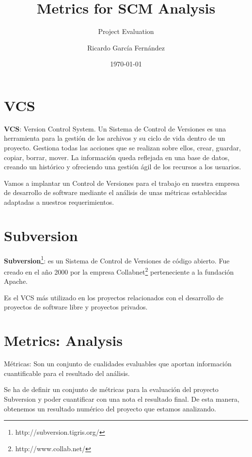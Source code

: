 \documentclass[11pt]{scrartcl}
\title{\textbf{Metrics for SCM Analysis}}
\subtitle{Project Evaluation}
\author{Ricardo Garc\'ia Fern\'andez}
\date{\today}
\begin{document}
\maketitle

\tableofcontents

\newpage

\section{VCS}

\par \textbf{VCS}: Version Control System. Un Sistema de Control de Versiones es una herramienta para la gesti\'on de los archivos y su ciclo de vida dentro de un proyecto. Gestiona todas las acciones que se realizan sobre ellos, crear, guardar, copiar, borrar, mover. La informaci\'on queda reflejada en una base de datos, creando un hist\'orico y ofreciendo una gesti\'on \'agil de los recursos a los usuarios.

\par Vamos a implantar un Control de Versiones para el trabajo en nuestra empresa de desarrollo de software mediante el an\'alisis de unas m\'etricas establecidas adaptadas a nuestros requerimientos.

\section{Subversion}

\textbf{Subversion}\footnote{http://subversion.tigris.org/}: es un Sistema de Control de Versiones de c\'odigo abierto. Fue creado en el a\~no 2000 por la empresa Collabnet\footnote{http://www.collab.net/} perteneciente a la fundaci\'on Apache.

\par Es el VCS m\'as utilizado en los proyectos relacionados con el desarrollo de proyectos de software libre y proyectos privados.

\section{Metrics: Analysis}

M\'etricas: Son un conjunto de cualidades evaluables que aportan informaci\'on cuantificable para el resultado del an\'alisis.

\par Se ha de definir un conjunto de m\'etricas para la evaluaci\'on del proyecto Subversion y poder cuantificar con una nota el resultado final. De esta manera, obtenemos un resultado num\'erico del proyecto que estamos analizando.
\end{document}
